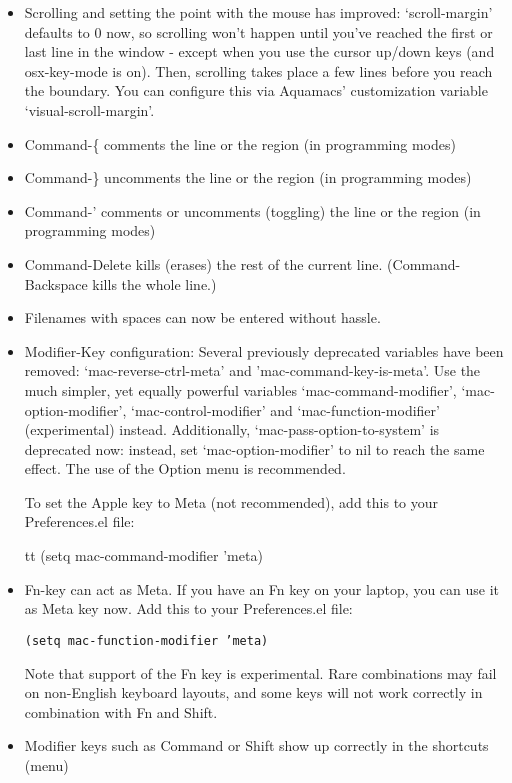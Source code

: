 \begin{itemize}
\item Scrolling and setting the point with the mouse has improved:
	`scroll-margin' defaults to 0 now, so scrolling won't happen until
	you've reached the first or last line in the window - except when
	you use the cursor up/down keys (and osx-key-mode is on). Then,
	scrolling takes place a few lines before you reach the
	boundary. You can configure this via Aquamacs' customization
	variable `visual-scroll-margin'.

\item Command-\{ comments the line or the region (in programming modes)
\item Command-\} uncomments the line or the region (in programming
	modes) 
\item Command-' comments or uncomments (toggling) the line or
	the region (in programming modes)

\item Command-Delete kills (erases) the rest of the current
	line. (Command-Backspace kills the whole line.)
	
\item Filenames with spaces can now be entered without hassle.
	
\item Modifier-Key configuration: Several previously deprecated
	variables have been removed: `mac-reverse-ctrl-meta' and
	'mac-command-key-is-meta'. Use the much simpler, yet
	equally powerful variables `mac-command-modifier', 
	`mac-option-modifier', `mac-control-modifier' and 
	`mac-function-modifier' (experimental) instead.
	Additionally, `mac-pass-option-to-system' is deprecated now:
	instead, set `mac-option-modifier' to nil to reach the same
	effect. The use of the Option menu is recommended. 
	
	To set the Apple key to Meta (not recommended), add this to your
	Preferences.el file:

 	{tt (setq mac-command-modifier 'meta)}

\item Fn-key can act as Meta. If you have an Fn key on your laptop,
	you can use it as Meta key now. Add this to your Preferences.el
	file:

 	{\tt (setq mac-function-modifier 'meta)}

	Note that support of the Fn key is experimental. Rare
	combinations may fail on non-English keyboard layouts,
	and some keys will not work correctly in combination with Fn and Shift.
	 
\item Modifier keys such as Command or Shift show up correctly in the
	shortcuts (menu)


\end{itemize}
